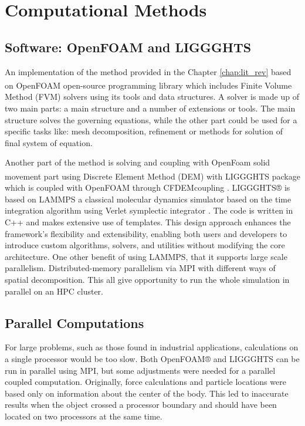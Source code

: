 \chapter{Computational Methods} \label{chap:comp_met}

\section{Software: OpenFOAM and LIGGGHTS}
An implementation of the method provided in the Chapter \ref{chap:lit_rev} based on OpenFOAM\textsuperscript{\textregistered} \cite{jasak2007openfoam} open-source programming library which includes Finite Volume Method (FVM) solvers using its tools and data structures. A solver is made up of two main parts: a main structure and a number of extensions or tools. The main structure solves the governing equations, while the other part could be used for a specific tasks like: mesh decomposition, refinement or methods for solution of final system of equation. 

Another part of the method is solving and coupling with OpenFoam solid movement part using Discrete Element Method (DEM) with LIGGGHTS\textsuperscript{\textregistered} package which is coupled with OpenFOAM through CFDEMcoupling \cite{kloss2011liggghts}. LIGGGHTS® is based on LAMMPS \cite{LAMMPS} a classical molecular dynamics simulator based on the time integration algorithm using Verlet symplectic integrator \cite{verlet}. The code is written in C++ and makes extensive use of templates. This design approach enhances the framework's flexibility and extensibility, enabling both users and developers to introduce custom algorithms, solvers, and utilities without modifying the core architecture. One other benefit of using LAMMPS, that it supports large scale parallelism. Distributed-memory parallelism via MPI with different ways of spatial decomposition. This all give opportunity to run the whole simulation in parallel on an HPC cluster.

\section{Parallel Computations}

For large problems, such as those found in industrial applications, calculations on a single processor would be too slow. Both OpenFOAM® and LIGGGHTS can be run in parallel using MPI, but some adjustments were needed for a parallel coupled computation. Originally, force calculations and particle locations were based only on information about the center of the body. This led to inaccurate results when the object crossed a processor boundary and should have been located on two processors at the same time.

